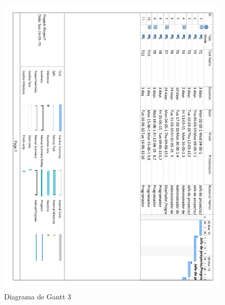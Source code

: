 \begin{figure}[!htp]
	\centering
	\includegraphics[page=3, scale=.7]{fig/real_gantt_diagram}
	\caption{Diagrama de Gantt 3}
\end{figure}

